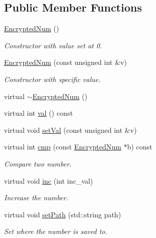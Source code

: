 \subsection*{Public Member Functions}
\begin{DoxyCompactItemize}
\item 
\mbox{\hyperlink{class_encrypted_num_ab53b1c8adf7c2b2770f00e88fe98f270}{Encrypted\+Num}} ()
\begin{DoxyCompactList}\small\item\em Constructor with value set at 0. \end{DoxyCompactList}\item 
\mbox{\hyperlink{class_encrypted_num_aeb560ce38d13963932a5247917d2bb7b}{Encrypted\+Num}} (const unsigned int \&v)
\begin{DoxyCompactList}\small\item\em Constructor with specific value. \end{DoxyCompactList}\item 
virtual \mbox{\hyperlink{class_encrypted_num_a795b635aeef60427532e1a8f26db8cdd}{$\sim$\+Encrypted\+Num}} ()
\item 
virtual int \mbox{\hyperlink{class_encrypted_num_a3cb78d22a4bbb6bd3199bcf10de04366}{val}} () const
\item 
virtual void \mbox{\hyperlink{class_encrypted_num_a4469ba057a691e6edacc25022596d1fa}{set\+Val}} (const unsigned int \&v)
\item 
virtual int \mbox{\hyperlink{class_encrypted_num_aec63be923f5ce470e63b78c9e70704b5}{cmp}} (const \mbox{\hyperlink{class_encrypted_num}{Encrypted\+Num}} $\ast$b) const
\begin{DoxyCompactList}\small\item\em Compare two number. \end{DoxyCompactList}\item 
virtual void \mbox{\hyperlink{class_encrypted_num_a838b2db3fc304aca318d0bc22a906c52}{inc}} (int inc\+\_\+val)
\begin{DoxyCompactList}\small\item\em Increase the number. \end{DoxyCompactList}\item 
virtual void \mbox{\hyperlink{class_encrypted_num_a27cca0eb4cf9f19035741be2a56d96a7}{set\+Path}} (std\+::string path)
\begin{DoxyCompactList}\small\item\em Set where the number is saved to. \end{DoxyCompactList}\item 

\end{DoxyCompactItemize}
